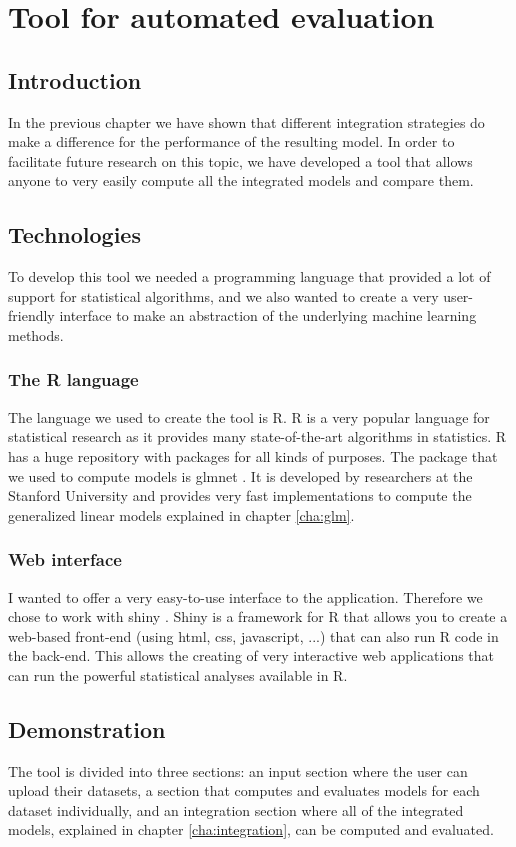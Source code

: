 \chapter{Tool for automated evaluation}
\label{cha:tool}

\section{Introduction}
\label{sec:tool-introduction}
In the previous chapter we have shown that different integration strategies do make a difference for the performance of the resulting model. In order to facilitate future research on this topic, we have developed a tool that allows anyone to very easily compute all the integrated models and compare them.
\section{Technologies}
\label{sec:tool-technologies}
To develop this tool we needed a programming language that provided a lot of support for statistical algorithms, and we also wanted to create a very user-friendly interface to make an abstraction of the underlying machine learning methods.
\subsection{The R language}
The language we used to create the tool is R. R is a very popular language for statistical research as it provides many state-of-the-art algorithms in statistics. R has a huge repository with packages for all kinds of purposes. The package that we used to compute models is glmnet \cite{glmnetvignette}. It is developed by researchers at the Stanford University and provides very fast implementations to compute the generalized linear models explained in chapter \ref{cha:glm}. 
\subsection{Web interface}
I wanted to offer a very easy-to-use interface to the application. Therefore we chose to work with shiny \cite{shiny}. Shiny is a framework for R that allows you to create a web-based front-end (using html, css, javascript, ...) that can also run R code in the back-end. This allows the creating of very interactive web applications that can run the powerful statistical analyses available in R.
\section{Demonstration}
\label{sec:tool-demonstration}
The tool is divided into three sections: an input section where the user can upload their datasets, a section that computes and evaluates models for each dataset individually, and an integration section where all of the integrated models, explained in chapter \ref{cha:integration}, can be computed and evaluated.
